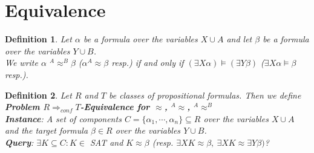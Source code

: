 \documentclass[12pt]{article}
\newcommand{\AMB}{\mbox{$^A$\hspace{-0.5mm}$\models^B$}}
\newcommand{\AM}{\mbox{$^A$\hspace{-0.5mm}$\models$}}
\newcommand{\AEQB}{\mbox{$^A$\hspace{-0.5mm}$\approx^B$}}
\newcommand{\AEQ}{\mbox{$^A$\hspace{-0.5mm}$\approx$}}
\newtheorem{definition}{Definition}[section]
\newtheorem{theorem}{Theorem}[section]
\begin{document}



\section{Equivalence}


\begin{definition}
Let $\alpha$ be a formula over the variables $X \cup A$ and let $\beta$ be a formula over the variables $Y \cup B$.\\
We write $\alpha $ \AEQB $\beta$ ($\alpha $\AEQ $\beta$ resp.) if and only if
$(\exists X \alpha) \models (\exists Y \beta)$ ($\exists X \alpha \models \beta$ resp.).
\end{definition}





\begin{definition}
Let $R$ and $T$ be classes of propositional formulas. Then we define\\
{\bf Problem $R \Longrightarrow_{conf} T$-Equivalence for $\approx$, \AEQ, \AEQB}\\
{\bf Instance}: A set of components $C=\{\alpha_1,\cdots,\alpha_n\} \subseteq R$ over the variables $X \cup A$ and the target formula $\beta \in R$ over the variables $Y \cup B$.\\
{\bf Query}:
 $ \exists K \subseteq C: K \in$ SAT and $K \approx \beta$ (resp. $\exists X K \approx \beta, \
\exists X K \approx \exists Y \beta)$?\\
\end{definition}
\end{document}
